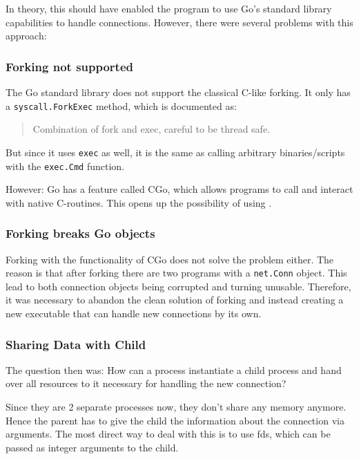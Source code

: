 \documentclass[10pt,a4paper,titlepage,twoside,english,final]{zhawreprt}
\begin{document}
In theory, this should have enabled the program to use \gls{Go}'s standard library capabilities to handle connections. However, there were several problems with this approach:

\subsubsection{Forking not supported}\label{sssec:ForkingNotSupported}
The \gls{Go} standard library does not support the classical \gls{C}-like forking. It only has a \texttt{syscall.\linebreak{}ForkExec} method, which is documented as:
\begin{quote}
Combination of fork and exec, careful to be thread safe.
\end{quote}
But since it uses \texttt{exec} as well, it is the same as calling arbitrary binaries/scripts with the \texttt{exec.Cmd} function.

However: \gls{Go} has a feature called \gls{CGo}, which allows programs to call and interact with native \gls{C}-routines. This opens up the possibility of using \cite{fork}.

\subsubsection{Forking breaks Go objects}\label{sssec:ForkingBreaksGoObjects}
Forking with the functionality of \gls{CGo} does not solve the problem either. The reason is that after forking there are two programs with a \texttt{net.Conn} object. This lead to both connection objects being corrupted and turning unusable. Therefore, it was necessary to abandon the clean solution of forking and instead creating a new executable that can handle new connections by its own.

\subsubsection{Sharing Data with Child}\label{sssec:SharingDataWithChild}
The question then was: How can a process instantiate a child process and hand over all resources to it necessary for handling the new connection?

Since they are 2 separate processes now, they don't share any memory anymore. Hence the parent has to give the child the information about the connection via arguments. The most direct way to deal with this is to use \glspl{fd}, which can be passed as integer arguments to the child.
\end{document}
